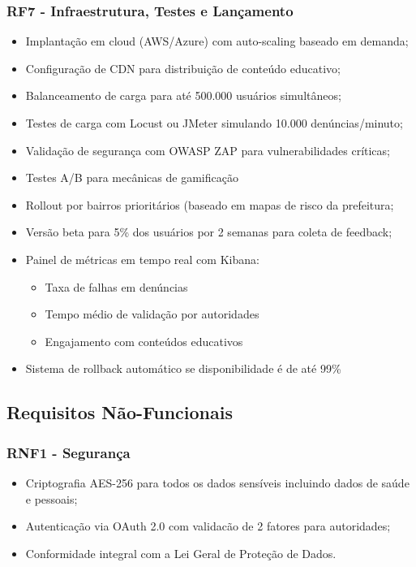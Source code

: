 \documentclass[a5paper, 12pt]{article}
\begin{document}
    \subsubsection{RF7 - Infraestrutura, Testes e Lançamento}
            \begin{itemize}
                \item Implantação em cloud (AWS/Azure) com auto-scaling baseado em demanda;
                \item Configuração de CDN para distribuição de conteúdo educativo;
                \item Balanceamento de carga para até 500.000 usuários simultâneos;
                \item Testes de carga com Locust ou JMeter simulando 10.000 denúncias/minuto;
                \item Validação de segurança com OWASP ZAP para vulnerabilidades críticas;
                \item Testes A/B para mecânicas de gamificação
                \item Rollout por bairros prioritários (baseado em mapas de risco da prefeitura;
                \item Versão beta para 5\% dos usuários por 2 semanas para coleta de feedback;
                \item Painel de métricas em tempo real com Kibana:
                    \begin{itemize}
                        \item Taxa de falhas em denúncias
                        \item Tempo médio de validação por autoridades
                        \item Engajamento com conteúdos educativos
                    \end{itemize}
                \item Sistema de rollback automático se disponibilidade é de até 99\%
            \end{itemize}
    
    \subsection{Requisitos Não-Funcionais}
        \subsubsection{RNF1 - Segurança}
            \begin{itemize}
                \item Criptografia AES-256 para todos os dados sensíveis incluindo dados de saúde e pessoais;
                \item Autenticação via OAuth 2.0 com validacão de 2 fatores para autoridades;
                \item Conformidade integral com a Lei Geral de Proteção de Dados.
            \end{itemize}
        
\end{document}
